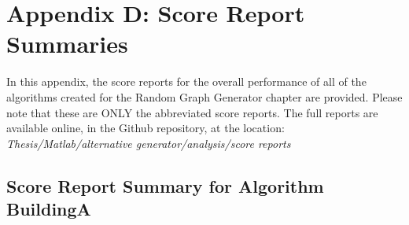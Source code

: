 \section{Appendix D: Score Report Summaries}

In this appendix, the score reports for the overall performance of all of the algorithms created for the Random Graph Generator chapter are provided.
Please note that these are ONLY the abbreviated score reports.
The full reports are available online, in the Github repository, at the location:
\emph{Thesis/Matlab/alternative generator/analysis/score reports}

\subsection*{Score Report Summary for Algorithm BuildingA}

